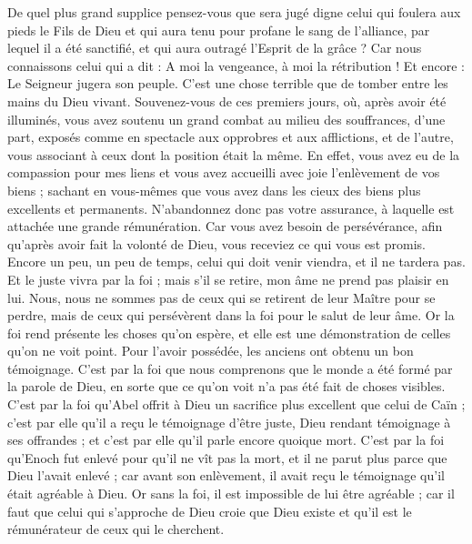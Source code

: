 \begin{multicols}{2}
De quel plus grand supplice pensez-vous que sera jugé digne celui qui foulera aux pieds le Fils de Dieu et qui aura tenu pour profane le sang de l'alliance, par lequel il a été sanctifié, et qui aura outragé l'Esprit de la grâce ?
Car nous connaissons celui qui a dit : A moi la vengeance, à moi la rétribution ! Et encore : Le Seigneur jugera son peuple.
C'est une chose terrible que de tomber entre les mains du Dieu vivant.
Souvenez-vous de ces premiers jours, où, après avoir été illuminés, vous avez soutenu un grand combat au milieu des souffrances,
d'une part, exposés comme en spectacle aux opprobres et aux afflictions, et de l'autre, vous associant à ceux dont la position était la même.
En effet, vous avez eu de la compassion pour mes liens et vous avez accueilli avec joie l'enlèvement de vos biens ; sachant en vous-mêmes que vous avez dans les cieux des biens plus excellents et permanents.
N’abandonnez donc pas votre assurance, à laquelle est attachée une grande rémunération.
Car vous avez besoin de persévérance, afin qu'après avoir fait la volonté de Dieu, vous receviez ce qui vous est promis.
Encore un peu, un peu de temps, celui qui doit venir viendra, et il ne tardera pas.
Et le juste vivra par la foi ; mais s’il se retire, mon âme ne prend pas plaisir en lui.
Nous, nous ne sommes pas de ceux qui se retirent de leur Maître pour se perdre, mais de ceux qui persévèrent dans la foi pour le salut de leur âme.
\VerseOne{}Or la foi rend présente les choses qu'on espère, et elle est une démonstration de celles qu'on ne voit point.
Pour l’avoir possédée, les anciens ont obtenu un bon témoignage.
C’est par la foi que nous comprenons que le monde a été formé par la parole de Dieu, en sorte que ce qu’on voit n’a pas été fait de choses visibles.
C’est par la foi qu’Abel offrit à Dieu un sacrifice plus excellent que celui de Caïn ; c’est par elle qu’il a reçu le témoignage d’être juste, Dieu rendant témoignage à ses offrandes ; et c’est par elle qu’il parle encore quoique mort.
C’est par la foi qu’Enoch fut enlevé pour qu’il ne vît pas la mort, et il ne parut plus parce que Dieu l’avait enlevé ; car avant son enlèvement, il avait reçu le témoignage qu’il était agréable à Dieu.
Or sans la foi, il est impossible de lui être agréable ; car il faut que celui qui s’approche de Dieu croie que Dieu existe et qu'il est le rémunérateur de ceux qui le cherchent.

\end{multicols}
